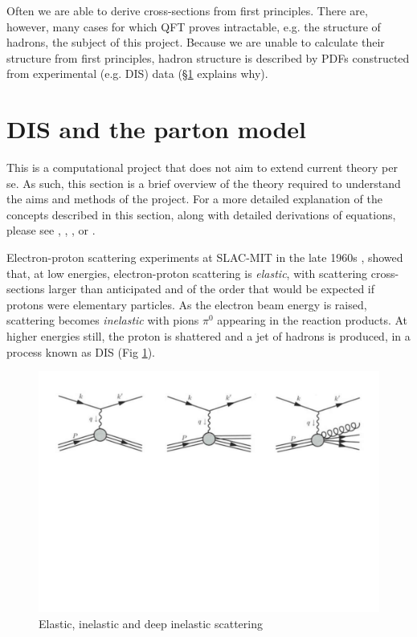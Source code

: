 \documentclass[12pt,a4paper]{report}
\begin{document}
Often we are able to derive cross-sections from first principles. There are, however, many cases for which QFT proves intractable, e.g. the structure of hadrons, the subject of this project. Because we are unable to calculate their structure from first principles, hadron structure is described by PDFs constructed from experimental (e.g. DIS) data (\S \ref{sec:theory_DIS} explains why).

\section{DIS and the parton model} \label{sec:theory_DIS}

This is a computational project that does not aim to extend current theory per se. As such, this section is a brief overview of the theory required to understand the aims and methods of the project. For a more detailed explanation of the concepts described in this section, along with detailed derivations of equations, please see \cite[chapter 14]{PeskinSchroeder}, \cite[chapter 20.6]{Weinberg:2}, \cite[chapter 9]{AitchisonHey:1}, or \cite[section 32.1.3]{Schwartz}.

Electron-proton scattering experiments at SLAC-MIT in the late 1960s \cite[pg 475--6]{PeskinSchroeder}, showed that, at low energies, electron-proton scattering is \emph{elastic}, with scattering cross-sections larger than anticipated and of the order that would be expected if protons were elementary particles. As the electron beam energy is raised, scattering becomes \emph{inelastic} with pions $\pi^0$ appearing in the reaction products. At higher energies still, the proton is shattered and a jet of hadrons is produced, in a process known as DIS \cite[pg 672]{Schwartz} (Fig \ref{fig:DIS}).

\begin{figure}[h]
\begin{center}
\includegraphics[scale=0.5]{DIS.pdf}
\caption{Elastic, inelastic and deep inelastic scattering \cite[pg 672]{Schwartz}}
\label{fig:DIS}
\end{center}
\end{figure}
\end{document}
